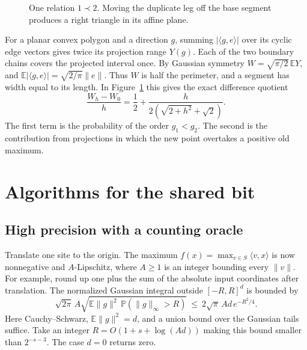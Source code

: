 \documentclass[11pt,letterpaper]{article}
\theoremstyle{definition}
\newcommand{\E}{\mathbb E}
\newcommand{\Prob}{\mathbb P}
\newcommand{\norm}[1]{\lVert#1\rVert}
\newcommand{\ip}[2]{\langle #1,#2\rangle}
\begin{document}
\begin{figure}[htbp]
\centering
{}
\caption{One relation \(1\prec2\). Moving the duplicate leg off the base
segment produces a right triangle in its affine plane.}
\label{fig:one-relation}
\end{figure}

For a planar convex polygon and a direction \(g\), summing
\(\lvert\ip{g}{e}\rvert\) over its cyclic edge vectors gives twice its
projection range \(Y(g)\). Each of the two boundary chains covers the
projected interval once. By Gaussian symmetry \(W=\sqrt{\pi/2}\,\E Y\),
and \(\E|\ip{g}{e}|=\sqrt{2/\pi}\norm e\). Thus \(W\) is half the
perimeter, and a segment has width equal to its length. In
Figure~\ref{fig:one-relation} this gives the exact difference quotient
\[
 \frac{W_h-W_0}{h}
 =\frac12+\frac{h}{2(\sqrt{2+h^2}+\sqrt2)} .
\]
The first term is the probability of the order \(g_1<g_2\). The second
is the contribution from projections in which the new point overtakes a
positive old maximum.

\section{Algorithms for the shared bit}
\label{sec:algorithms}

\subsection{High precision with a counting oracle}
Translate one site to the origin. The maximum
\(f(x)=\max_{v\in S}\ip{v}{x}\) is now nonnegative and \(A\)-Lipschitz,
where \(A\ge1\) is an integer bounding every \(\norm v\). For example,
round up one plus the sum of the absolute input coordinates after translation.
The normalized Gaussian integral outside \([-R,R]^d\) is bounded by
\[
 \sqrt{2\pi}\,A\sqrt{\E\norm g^2\,\Prob(\norm g_\infty>R)}
 \ \le\ 2\sqrt\pi\,A d\,e^{-R^2/4}.
\]
Here Cauchy--Schwarz, \(\E\norm g^2=d\), and a union bound over the
Gaussian tails suffice. Take an integer \(R=O(1+s+\log(Ad))\) making this
bound smaller than \(2^{-s-3}\). The case \(d=0\) returns zero.
\end{document}
